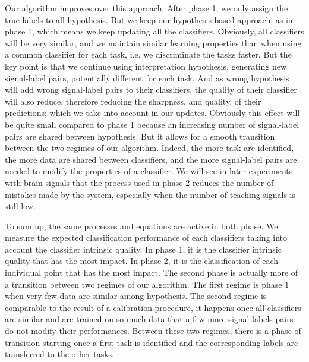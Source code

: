 Our algorithm improves over this approach. After phase 1, we only assign the true labels to all hypothesis. But we keep our hypothesis based approach, as in phase 1, which means we keep updating all the classifiers. Obviously, all classifiers will be very similar, and we maintain similar learning properties than when using a common classifier for each task, i.e. we discriminate the tasks faster. But the key point is that we continue using interpretation hypothesis, generating new signal-label pairs, potentially different for each task. And as wrong hypothesis will add wrong signal-label pairs to their classifiers, the quality of their classifier will also reduce, therefore reducing the sharpness, and quality, of their predictions; which we take into account in our updates. Obviously this effect will be quite small compared to phase 1 because an increasing number of signal-label pairs are shared between hypothesis. But it allows for a smooth transition between the two regimes of our algorithm. Indeed, the more task are identified, the more data are shared between classifiers, and the more signal-label pairs are needed to modify the properties of a classifier. We will see in later experiments with brain signals that the process used in phase 2 reduces the number of mistakes made by the system, especially when the number of teaching signals is still low.


To sum up, the same processes and equations are active in both phase. We measure the expected classification performance of each classifiers taking into account the classifier intrinsic quality. In phase 1, it is the classifier intrinsic quality that has the most impact. In phase 2, it is the classification of each individual point that has the most impact. The second phase is actually more of a transition between two regimes of our algorithm. The first regime is phase 1 when very few data are similar among hypothesis. The second regime is comparable to the result of a calibration procedure, it happens once all classifiers are similar and are trained on so much data that a few more signal-labels pairs do not modify their performances. Between these two regimes, there is a phase of transition starting once a first task is identified and the corresponding labels are  transferred to the other tasks.

